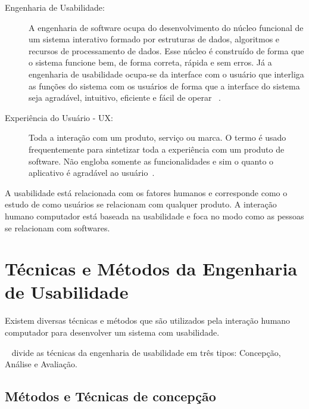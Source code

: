 \begin{description}
\item[Engenharia de Usabilidade:]

A engenharia de software ocupa do desenvolvimento do núcleo funcional de um sistema interativo formado por estruturas de dados, algoritmos e recursos de processamento de dados. Esse núcleo é construído de forma que o sistema funcione bem, de forma correta, rápida e sem erros. Já a engenharia de usabilidade ocupa-se da interface com o usuário que interliga as funções do sistema com os usuários de forma que a interface do sistema seja agradável, intuitivo, eficiente e fácil de operar ~\cite{cybis2010}.
%


\item[Experiência do Usuário - UX: ]

Toda a interação com um produto, serviço ou marca. O termo é usado frequentemente para sintetizar toda a experiência com um produto de software. Não engloba  somente as funcionalidades e sim o quanto o aplicativo é agradável ao usuário~\cite{travis2013}.
%	



\end{description}

A usabilidade está relacionada com os fatores humanos e corresponde como o estudo de como usuários se relacionam com qualquer produto. A interação humano computador está baseada na usabilidade e foca no modo como as pessoas se relacionam com softwares.


\section{Técnicas e Métodos da Engenharia de Usabilidade}


Existem diversas técnicas e métodos que são utilizados pela interação humano computador para desenvolver um sistema com usabilidade.

~ divide as técnicas da engenharia de usabilidade em três tipos: Concepção, Análise e Avaliação.

\subsection{Métodos e Técnicas de concepção}


